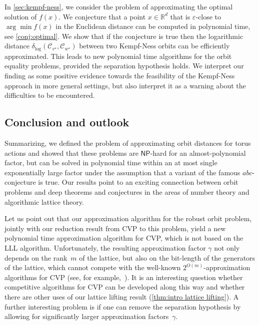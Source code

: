 \documentclass[10pt,a4paper]{article}
\theoremstyle{definition}
\DeclareMathOperator{\poly}{poly}
\newcommand{\distLD}{\delta_{\log}}
\newcommand{\RR}{\mathbb{R}}
\newcommand{\KK}{\ensuremath{\mathcal{C}}}
\newcommand{\NP}{\ensuremath{\mathsf{NP}}\xspace}
\newcommand{\abc}{\texorpdfstring{$abc$}{abc}}
\numberwithin{equation}{section}
\begin{document}
In \cref{sec:kempf-ness}, we consider the problem of approximating the optimal solution of $f(x)$. We conjecture that a point $x\in\RR^d$ that is $\varepsilon$-close to $\arg\min f(x)$ in the Euclidean distance can be computed in polynomial time, see \cref{conj:optimal}. We show that if the conjecture is true then the logarithmic distance $\distLD(\KK_{v^\star},\KK_{w^\star})$ between two Kempf-Ness orbits can be efficiently approximated.
This leads to new polynomial time algorithms for the orbit equality problems,
provided the separation hypothesis holds.
We interpret our finding as some positive evidence towards the feasibility
of the Kempf-Ness approach in more general settings, but also interpret it
as a warning about the difficulties to be encountered.


\subsection{Conclusion and outlook}\label{subsec:intro conclusion and outlook}
Summarizing, we defined the problem of approximating orbit distances for torus actions and
showed that these problems are \NP-hard for an almost-polynomial factor,
but can be solved in polynomial time within an at most single exponentially large factor
under the assumption that a variant of the famous \abc-conjecture is true.
Our results point to an exciting connection between orbit problems and deep theorems
and conjectures in the areas of number theory and algorithmic lattice theory.

Let us point out that
our approximation algorithm %
for the robust orbit problem,
jointly with our reduction result from CVP to this problem,
yield a new polynomial time approximation algorithm for CVP,
which is not based on the LLL algorithm. %
Unfortunately,
the resulting approximation factor $\gamma$ %
not only depends on the rank~$m$ of the lattice,
but also on the bit-length of the generators of the lattice,
which cannot compete with the well-known $2^{O(m)}$-approximation algorithms for CVP
(see, for example,~\cite[Lemma~2.12]{micciancio}).
It is an interesting question whether competitive algorithms for CVP can be developed along this way and whether there are other uses of our lattice lifting result
(\cref{thm:intro lattice lifting}).
A further interesting problem is %
if one can remove the separation hypothesis
by allowing for significantly larger approximation factors~$\gamma$.
\end{document}
